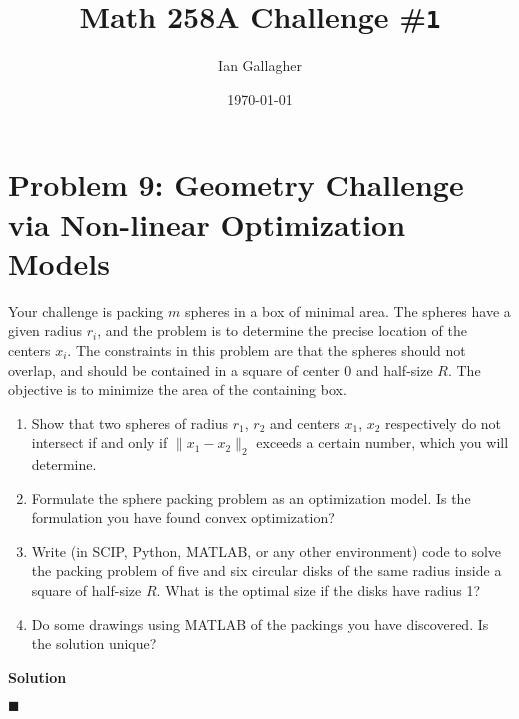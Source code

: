\documentclass[11pt]{article}
\title{Math 258A Challenge \#\texttt{1}}
\author{Ian Gallagher}
\date{\today}
\theoremstyle{problemstyle}
\newenvironment{solution}
  {\noindent\textbf{Solution}\quad}
  {\hfill$\blacksquare$\par\vspace{1em}}
\begin{document}
\maketitle

\section*{Problem 9: Geometry Challenge via Non-linear Optimization Models}
Your challenge is packing $m$ spheres in a box of minimal area. The spheres
have a given radius $r_i$, and the problem is to determine the precise location
of the centers $x_i$. The constraints in this problem are that the spheres
should not overlap, and should be contained in a square of center $0$ and
half-size $R$. The objective is to minimize the area of the containing box.

\begin{enumerate}
    \item Show that two spheres of radius $r_1$, $r_2$ and centers $x_1$, $x_2$
        respectively do not intersect if and only if $\|x_1 - x_2\|_2$ exceeds
        a certain number, which you will determine.
    \item Formulate the sphere packing problem as an optimization model. Is the
        formulation you have found convex optimization?
    \item Write (in SCIP, Python, MATLAB, or any other environment) code to
        solve the packing problem of five and six circular disks of the same
        radius inside a square of half-size $R$. What is the optimal size if
        the disks have radius 1?
    \item Do some drawings using MATLAB of the packings you have discovered. Is
        the solution unique?
\end{enumerate}

\begin{solution}

\end{solution}
\end{document}
